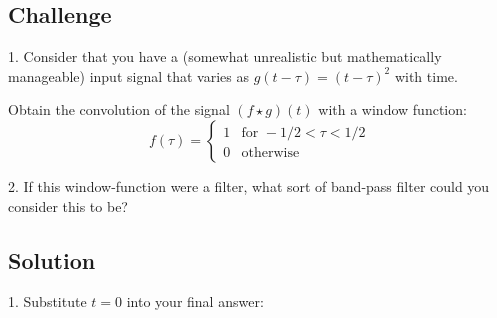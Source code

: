 \subsection*{Challenge}
1. Consider that you have a (somewhat unrealistic but mathematically manageable) input signal that varies as $g(t-\tau)=(t-\tau)^2$ with time. 

Obtain the convolution of the signal $(f \star g)(t)$ with a window function:
\begin{equation}
    f(\tau)=
    \begin{cases}
        1 & \text{for } -1/2 < \tau < 1/2\\
        0 & \text{otherwise}
    \end{cases}
\end{equation}

2. If this window-function were a filter, what sort of band-pass filter could you consider this to be?

\subsection*{Solution}
1. Substitute $t=0$ into your final answer: 




%
%
%
%




